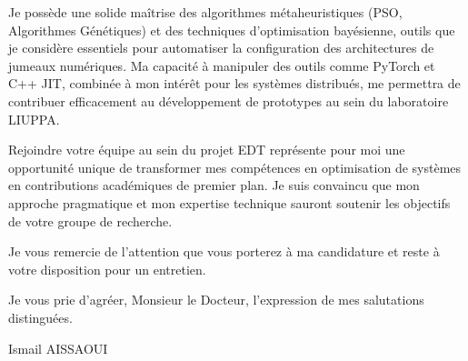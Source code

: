 \documentclass[a4paper,11pt]{letter}
\begin{document}
Je possède une solide maîtrise des algorithmes métaheuristiques (PSO, Algorithmes Génétiques) et des techniques d'optimisation bayésienne, outils que je considère essentiels pour automatiser la configuration des architectures de jumeaux numériques. Ma capacité à manipuler des outils comme PyTorch et C++ JIT, combinée à mon intérêt pour les systèmes distribués, me permettra de contribuer efficacement au développement de prototypes au sein du laboratoire LIUPPA.

Rejoindre votre équipe au sein du projet EDT représente pour moi une opportunité unique de transformer mes compétences en optimisation de systèmes en contributions académiques de premier plan. Je suis convaincu que mon approche pragmatique et mon expertise technique sauront soutenir les objectifs de votre groupe de recherche.

Je vous remercie de l'attention que vous porterez à ma candidature et reste à votre disposition pour un entretien.

Je vous prie d'agréer, Monsieur le Docteur, l'expression de mes salutations distinguées.

\bigskip

Ismail AISSAOUI
\end{document}
